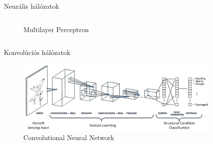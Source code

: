 \documentclass[aspectratio=169]{beamer}
\begin{document}
\begin{frame}{Neurális hálózatok}
\begin{columns}[b]
\begin{column}{0.48\textwidth}
\begin{figure}
                \caption*{Multilayer Perceptron\footnotemark[1]}
            \end{figure}
        \end{column}
    \end{columns}
\end{frame}

\begin{frame}{Konvolúciós hálózatok}
    \begin{figure}
        \centering
        \includegraphics[width=0.9\textwidth]{./tex_images/cnn.png}
        \caption*{Convolutional Neural Network\footnotemark}
    \end{figure}

\end{frame}
\end{document}
